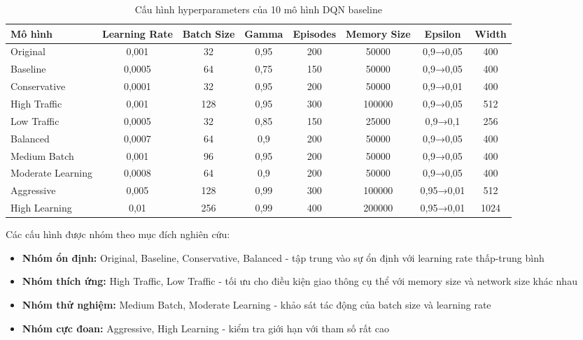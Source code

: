 \begin{table}[!htp]
\centering
\caption{Cấu hình hyperparameters của 10 mô hình DQN baseline}
\label{tab:base_model_configs}
\begin{tabular}{|l|c|c|c|c|c|c|c|}
\hline
\textbf{Mô hình} & \textbf{Learning Rate} & \textbf{Batch Size} & \textbf{Gamma} & \textbf{Episodes} & \textbf{Memory Size} & \textbf{Epsilon} & \textbf{Width} \\
\hline
Original & 0,001 & 32 & 0,95 & 200 & 50000 & 0,9→0,05 & 400 \\
\hline
Baseline & 0,0005 & 64 & 0,75 & 150 & 50000 & 0,9→0,05 & 400 \\
\hline
Conservative & 0,0001 & 32 & 0,95 & 200 & 50000 & 0,9→0,01 & 400 \\
\hline
High Traffic & 0,001 & 128 & 0,95 & 300 & 100000 & 0,9→0,05 & 512 \\
\hline
Low Traffic & 0,0005 & 32 & 0,85 & 150 & 25000 & 0,9→0,1 & 256 \\
\hline
Balanced & 0,0007 & 64 & 0,9 & 200 & 50000 & 0,9→0,05 & 400 \\
\hline
Medium Batch & 0,001 & 96 & 0,95 & 200 & 50000 & 0,9→0,05 & 400 \\
\hline
Moderate Learning & 0,0008 & 64 & 0,9 & 200 & 50000 & 0,9→0,05 & 400 \\
\hline
Aggressive & 0,005 & 128 & 0,99 & 300 & 100000 & 0,95→0,01 & 512 \\
\hline
High Learning & 0,01 & 256 & 0,99 & 400 & 200000 & 0,95→0,01 & 1024 \\
\hline
\end{tabular}
\end{table}

Các cấu hình được nhóm theo mục đích nghiên cứu:
\begin{itemize}
    \item \textbf{Nhóm ổn định:} Original, Baseline, Conservative, Balanced - tập trung vào sự ổn định với learning rate thấp-trung bình
    \item \textbf{Nhóm thích ứng:} High Traffic, Low Traffic - tối ưu cho điều kiện giao thông cụ thể với memory size và network size khác nhau
    \item \textbf{Nhóm thử nghiệm:} Medium Batch, Moderate Learning - khảo sát tác động của batch size và learning rate
    \item \textbf{Nhóm cực đoan:} Aggressive, High Learning - kiểm tra giới hạn với tham số rất cao
\end{itemize}

